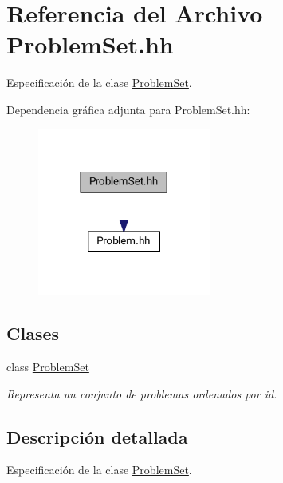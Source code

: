 \hypertarget{_problem_set_8hh}{}\section{Referencia del Archivo Problem\+Set.\+hh}
\label{_problem_set_8hh}


Especificación de la clase \mbox{\hyperlink{class_problem_set}{Problem\+Set}}.  


Dependencia gráfica adjunta para Problem\+Set.\+hh\+:\nopagebreak
\begin{figure}[H]
\begin{center}
\leavevmode
\includegraphics[width=161pt]{_problem_set_8hh__incl}
\end{center}
\end{figure}
\subsection*{Clases}
\begin{DoxyCompactItemize}
\item 
class \mbox{\hyperlink{class_problem_set}{Problem\+Set}}
\begin{DoxyCompactList}\small\item\em Representa un conjunto de problemas ordenados por id. \end{DoxyCompactList}\end{DoxyCompactItemize}


\subsection{Descripción detallada}
Especificación de la clase \mbox{\hyperlink{class_problem_set}{Problem\+Set}}. 

